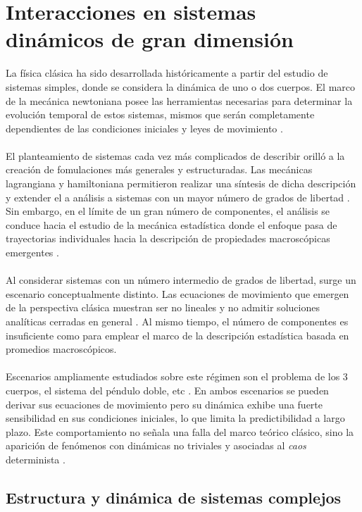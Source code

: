 \chapter{Interacciones en sistemas dinámicos de gran dimensión}

\setlength{\parindent}{0cm} La física clásica ha sido desarrollada históricamente a partir del estudio de sistemas simples, donde se considera la dinámica de uno o dos cuerpos. El marco de la mecánica newtoniana posee las herramientas necesarias para determinar la evolución temporal de estos sistemas, mismos que serán completamente dependientes de las condiciones iniciales y leyes de movimiento \cite{kleppner2014introduction}.
\\
\\
El planteamiento de sistemas cada vez más complicados de describir orilló a la creación de fomulaciones más generales y estructuradas. Las mecánicas lagrangiana y hamiltoniana permitieron realizar una síntesis de dicha descripción y extender el a análisis a sistemas con un mayor número de grados de libertad \cite{viniegra2008mecanica}. Sin embargo, en el límite de un gran número de componentes, el análisis se conduce hacia el 	 estudio de la mecánica estadística donde el enfoque pasa de trayectorias individuales hacia la descripción de propiedades macroscópicas emergentes \cite{reichl2016modern}.\\
\\
Al considerar sistemas con un número intermedio de grados de libertad, surge un escenario conceptualmente distinto. Las ecuaciones de movimiento que emergen de la perspectiva clásica muestran ser no lineales y no admitir soluciones analíticas cerradas en general \cite{strogatz2001nonlinear}. Al mismo tiempo, el número de componentes es insuficiente como para emplear el marco de la descripción estadística basada en promedios macroscópicos.\\
\\
Escenarios ampliamente estudiados sobre este régimen son el problema de los 3 cuerpos, el sistema del péndulo doble, etc \cite{stickler2016basic}. En ambos escenarios se pueden derivar sus ecuaciones de movimiento pero su dinámica exhibe una fuerte sensibilidad en sus condiciones iniciales, lo que limita la predictibilidad a largo plazo. Este comportamiento no señala una falla del marco teórico clásico, sino la aparición de fenómenos con dinámicas no triviales y asociadas al \textit{caos} determinista \cite{strogatz2001nonlinear}.

\section{Estructura y dinámica de sistemas complejos}

